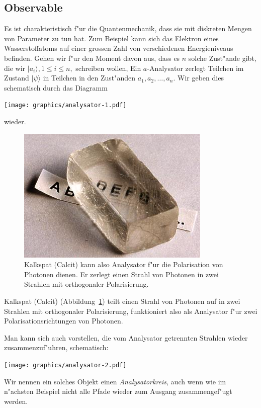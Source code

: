 \subsection{Observable}
Es ist charakteristisch f"ur die Quantenmechanik, dass sie mit diskreten
Mengen von Parameter zu tun hat. Zum Beispiel kann sich das Elektron eines
Wasserstoffatoms auf einer grossen Zahl von verschiedenen Energieniveaus
befinden. Gehen wir f"ur den Moment davon aus, dass es $n$ solche Zust"ande
gibt, die wir $|a_i\rangle, 1\le i\le n,$ schreiben wollen,
Ein $a$-Analysator zerlegt Teilchen im Zustand $|\psi\rangle$ in 
Teilchen in den Zust"anden $a_1,a_2,\dots,a_n$. Wir geben dies
schematisch durch das Diagramm
\begin{center}
\texttt{[image: graphics/analysator-1.pdf]}
\end{center}
wieder.
\begin{figure}
\centering
\includegraphics{images/calcit.jpg}
\caption{Kalkspat (Calcit) kann also Analysator f"ur die Polarisation
von Photonen dienen. Er zerlegt einen Strahl von Photonen in zwei
Strahlen mit orthogonaler Polarisierung.
\label{calcit}}
\end{figure}
Kalkspat (Calcit) (Abbildung~\ref{calcit}) teilt einen Strahl
von Photonen auf in zwei Strahlen mit orthogonaler Polarisierung,
funktioniert also als Analysator f"ur zwei Polarisationsrichtungen
von Photonen.

Man kann sich auch vorstellen, die vom Analysator getrennten Strahlen
wieder zusammenzuf"uhren, schematisch:
\begin{center}
\texttt{[image: graphics/analysator-2.pdf]}
\end{center}
Wir nennen ein solches Objekt einen {\em Analysatorkreis}, auch wenn wie
im n"achsten Beispiel nicht alle Pfade wieder zum Ausgang zusammengef"ugt
werden.

